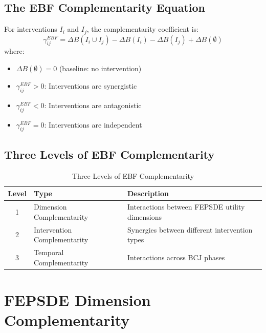 \subsection{The EBF Complementarity Equation}

\begin{theorem}
For interventions $I_i$ and $I_j$, the complementarity coefficient is:
\begin{equation}
\gamma^{EBF}_{ij} = \Delta B(I_i \cup I_j) - \Delta B(I_i) - \Delta B(I_j) + \Delta B(\emptyset)
\end{equation}
where:
\begin{itemize}[noitemsep]
    \item $\Delta B(\emptyset) = 0$ (baseline: no intervention)
    \item $\gamma^{EBF}_{ij} > 0$: Interventions are synergistic
    \item $\gamma^{EBF}_{ij} < 0$: Interventions are antagonistic
    \item $\gamma^{EBF}_{ij} = 0$: Interventions are independent
\end{itemize}
\end{theorem}

\subsection{Three Levels of EBF Complementarity}

\begin{table}[h]
\centering
\caption{Three Levels of EBF Complementarity}
\label{tab:ebf-levels}
\renewcommand{\arraystretch}{1.4}
\begin{tabular}{@{}clp{6cm}@{}}
\toprule
\textbf{Level} & \textbf{Type} & \textbf{Description} \\
\midrule
1 & Dimension Complementarity & Interactions between FEPSDE utility dimensions \\
2 & Intervention Complementarity & Synergies between different intervention types \\
3 & Temporal Complementarity & Interactions across BCJ phases \\
\bottomrule
\end{tabular}
\end{table}

\section{FEPSDE Dimension Complementarity}
\label{sec:fepsde}

